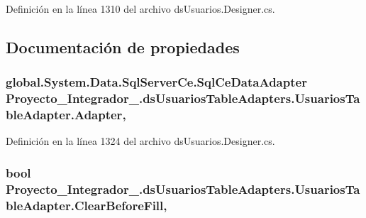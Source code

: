 Definición en la línea 1310 del archivo ds\-Usuarios.\-Designer.\-cs.



\subsection{Documentación de propiedades}
\hypertarget{class_proyecto___integrador__3_1_1ds_usuarios_table_adapters_1_1_usuarios_table_adapter_a46252bad9dadbf20130beca25d50b5bc}{
\subsubsection[{Adapter}]{\setlength{\rightskip}{0pt plus 5cm}global.\-System.\-Data.\-Sql\-Server\-Ce.\-Sql\-Ce\-Data\-Adapter Proyecto\-\_\-\-Integrador\-\_.\-ds\-Usuarios\-Table\-Adapters.\-Usuarios\-Table\-Adapter.\-Adapter\hspace{0.3cm}{\ttfamily [get]}, {\ttfamily [package]}}}\label{class_proyecto___integrador__3_1_1ds_usuarios_table_adapters_1_1_usuarios_table_adapter_a46252bad9dadbf20130beca25d50b5bc}


Definición en la línea 1324 del archivo ds\-Usuarios.\-Designer.\-cs.

\hypertarget{class_proyecto___integrador__3_1_1ds_usuarios_table_adapters_1_1_usuarios_table_adapter_ab6ed4304ca20381f5dbee95dff3d0256}{
\subsubsection[{Clear\-Before\-Fill}]{\setlength{\rightskip}{0pt plus 5cm}bool Proyecto\-\_\-\-Integrador\-\_.\-ds\-Usuarios\-Table\-Adapters.\-Usuarios\-Table\-Adapter.\-Clear\-Before\-Fill\hspace{0.3cm}{\ttfamily [get]}, {\ttfamily [set]}}}\label{class_proyecto___integrador__3_1_1ds_usuarios_table_adapters_1_1_usuarios_table_adapter_ab6ed4304ca20381f5dbee95dff3d0256}


